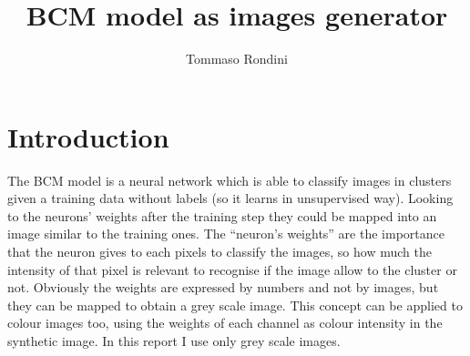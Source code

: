 \documentclass[a4paper,12pt]{article}
\title{BCM model as images generator}
\author{Tommaso Rondini}
\begin{document}
\maketitle

\section{Introduction}
The BCM model is a neural network which is able to classify images in clusters given a training data without labels (so it learns in unsupervised way).
Looking to the neurons' weights after the training step they could be mapped into an image similar to the training ones.
The ``neuron's weights'' are the importance that the neuron gives to each pixels to classify the images, so how much the intensity of that pixel is relevant to recognise if the image allow to the cluster or not.
Obviously the weights are expressed by numbers and not by images, but they can be mapped to obtain a grey scale image.
This concept can be applied to colour images too, using the weights of each channel as colour intensity in the synthetic image.
In this report I use only grey scale images.
\end{document}
